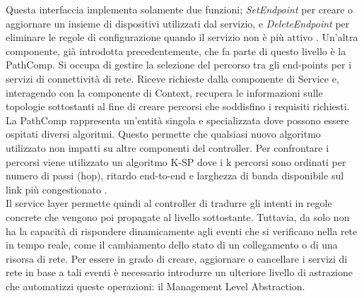 Questa interfaccia implementa solamente due funzioni; \textit{SetEndpoint} per creare o aggiornare un insieme di dispositivi utilizzati dal servizio,
e \textit{DeleteEndpoint} per eliminare le regole di configurazione quando il servizio non è più attivo \cite{D32}. 
Un'altra componente, già introdotta precedentemente, che fa parte di questo livello è la PathComp. Si occupa di gestire la selezione del percorso tra gli end-points per i servizi di connettività di rete. 
Riceve richieste dalla componente di Service e, interagendo con la componente di Context, recupera le informazioni sulle topologie sottostanti al fine di creare
percorsi che soddisfino i requisiti richiesti.
\\La PathComp rappresenta un'entità singola e specializzata dove possono essere ospitati diversi algoritmi. Questo permette che qualsiasi nuovo algoritmo utilizzato non impatti su altre componenti del controller.
Per confrontare i percorsi viene utilizzato un algoritmo K-SP dove i k percorsi sono ordinati per numero di passi (hop), ritardo end-to-end e larghezza di banda disponibile sul link più congestionato \cite{D53}. 
\\Il service layer permette quindi al controller di tradurre gli intenti in regole concrete che vengono poi propagate al livello sottostante.
Tuttavia, da solo non ha la capacità di rispondere dinamicamente agli eventi che si verificano nella rete in tempo reale, come il cambiamento dello stato di un collegamento o di una risorsa di rete. %
Per essere in grado di creare, aggiornare o cancellare i servizi di rete in base a tali eventi è necessario introdurre un ulteriore livello di astrazione che automatizzi queste operazioni: il Management Level Abstraction.

